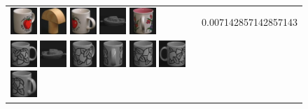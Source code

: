 {\begin{figure}[p]
\begin{tabular}{m{11cm} | m{3cm} |}
\includegraphics[width=1cm]{coil/beeld-39.eps}
\includegraphics[width=1cm]{coil/beeld-4.eps}
\includegraphics[width=1cm]{coil/beeld-40.eps}
\includegraphics[width=1cm]{coil/beeld-24.eps}
\includegraphics[width=1cm]{coil/beeld-11.eps}
& {\scriptsize 0.007142857142857143}
\\
\includegraphics[width=1cm]{coil/beeld-48.eps}
\includegraphics[width=1cm]{coil/beeld-27.eps}
\includegraphics[width=1cm]{coil/beeld-53.eps}
\includegraphics[width=1cm]{coil/beeld-50.eps}
\includegraphics[width=1cm]{coil/beeld-52.eps}
\includegraphics[width=1cm]{coil/beeld-51.eps}
\includegraphics[width=1cm]{coil/beeld-49.eps}

\end{tabular}
\end{figure}}
